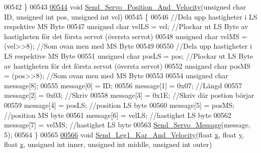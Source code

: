 \begin{DoxyCode}
00542 \}
00543 
\hypertarget{servo___u_a_r_t_8c_source.tex_l00544}{}\hyperlink{servo___u_a_r_t_8h_aef28545296037ecc0350638a407a680f}{00544} \textcolor{keywordtype}{void} \hyperlink{servo___u_a_r_t_8c_aef28545296037ecc0350638a407a680f}{Send\_Servo\_Position\_And\_Velocity}(\textcolor{keywordtype}{unsigned} \textcolor{keywordtype}{char} ID, \textcolor{keywordtype}{unsigned} \textcolor{keywordtype}{int} pos, \textcolor{keywordtype}{
      unsigned} \textcolor{keywordtype}{int} vel)
00545 \{
00546     \textcolor{comment}{//Dela upp hastigheter i LS respektive MS Byte}
00547     \textcolor{keywordtype}{unsigned} \textcolor{keywordtype}{char} velLS = vel; \textcolor{comment}{//Plockar ut LS Byte av hastigheten för det första servot (översta servot)}
00548     \textcolor{keywordtype}{unsigned} \textcolor{keywordtype}{char} velMS = (vel>>8); \textcolor{comment}{//Som ovan men med MS Byte}
00549     
00550     \textcolor{comment}{//Dela upp hastigheter i LS respektive MS Byte}
00551     \textcolor{keywordtype}{unsigned} \textcolor{keywordtype}{char} posLS = pos; \textcolor{comment}{//Plockar ut LS Byte av hastigheten för det första servot (översta servot)}
00552     \textcolor{keywordtype}{unsigned} \textcolor{keywordtype}{char} posMS = (pos>>8); \textcolor{comment}{//Som ovan men med MS Byte}
00553     
00554     \textcolor{keywordtype}{unsigned} \textcolor{keywordtype}{char} message[8];
00555     message[0] = ID;
00556     message[1] = 0x07;  \textcolor{comment}{//Längd }
00557     message[2] = 0x03;  \textcolor{comment}{//Skriv}
00558     message[3] = 0x1E;  \textcolor{comment}{//Skriv där postion börjar}
00559     message[4] = posLS; \textcolor{comment}{//position LS byte }
00560     message[5] = posMS; \textcolor{comment}{//position MS byte}
00561     message[6] = velLS; \textcolor{comment}{//hastighet LS byte}
00562     message[7] = velMS; \textcolor{comment}{//hastighet LS byte}
00563     \hyperlink{servo___u_a_r_t_8c_a2ed3a2903977a774d1b174665d50661c}{Send\_Servo\_Message}(message, 5);
00564 \}
00565 
\hypertarget{servo___u_a_r_t_8c_source.tex_l00566}{}\hyperlink{servo___u_a_r_t_8h_a1501df88c7ba1630f81577522ac2bbeb}{00566} \textcolor{keywordtype}{void} \hyperlink{servo___u_a_r_t_8c_a1501df88c7ba1630f81577522ac2bbeb}{Send\_Leg1\_Kar\_And\_Velocity}(\textcolor{keywordtype}{float} \hyperlink{sensor_8h_a6c4b361d72eb3767ba424ac9a6ecf52b}{x}, \textcolor{keywordtype}{float} \hyperlink{sensor_8h_a0ed6a908288e0cd87f79c1b5ab56d07c}{y}, \textcolor{keywordtype}{float} 
      \hyperlink{over__hinder_8c_af73583b1e980b0aa03f9884812e9fd4d}{z}, \textcolor{keywordtype}{unsigned} \textcolor{keywordtype}{int} inner, \textcolor{keywordtype}{unsigned} \textcolor{keywordtype}{int} middle, \textcolor{keywordtype}{unsigned} \textcolor{keywordtype}{int} outer)

\end{DoxyCode}
